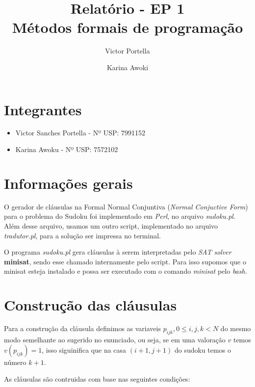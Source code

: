 \documentclass[11pt]{article}
\title{Relatório - EP 1 \\ Métodos formais de programação}
\author{Victor Portella \and Karina Awoki}
\begin{document}
\maketitle

\section{Integrantes}

\begin{itemize}

\item Victor Sanches Portella - Nº USP: 7991152

\item Karina Awoku - Nº USP: 7572102

\end{itemize}


\section{Informações gerais}

O gerador de cláusulas na Formal Normal Conjuntiva (\emph{Normal Conjuctive Form}) para o problema do Sudoku foi implementado em \emph{Perl}, no arquivo 
\emph{sudoku.pl}. Além desse arquivo, usamos um outro script, implementado no arquivo \emph{tradutor.pl}, para a solução ser impressa no terminal.

O programa \emph{sudoku.pl} gera cláusulas à serem interpretadas pelo \emph{SAT solver} \textbf{\color{red}minisat}, sendo esse chamado internamente pelo script. Para isso supomos que o minisat esteja instalado e possa ser executado com o comando \emph{minisat} pelo \emph{bash}.


\section{Construção das cláusulas}

Para a construção da cláusula definimos as variaveis $p_{ijk}, 0\leq i,j,k<N$ 
do mesmo modo semelhante ao sugerido no enunciado, ou seja, se em uma valoração $v$ temos $v(p_{ijk}) = 1$, isso siguinifica que na casa $(i+1,j+1)$ do sudoku temos o número $k+1$.

As cláusulas são contruidas com base nas seguintes condições:
\end{document}
